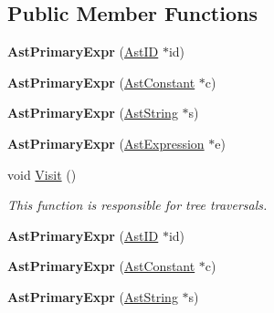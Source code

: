 \subsection*{Public Member Functions}
\begin{DoxyCompactItemize}
\item 
\hypertarget{classAstPrimaryExpr_a92ac6a98d42e522c7476768c959e2044}{{\bfseries Ast\-Primary\-Expr} (\hyperlink{classAstID}{Ast\-I\-D} $\ast$id)}\label{classAstPrimaryExpr_a92ac6a98d42e522c7476768c959e2044}

\item 
\hypertarget{classAstPrimaryExpr_a03809c945a11ab5345f50956cff84f82}{{\bfseries Ast\-Primary\-Expr} (\hyperlink{classAstConstant}{Ast\-Constant} $\ast$c)}\label{classAstPrimaryExpr_a03809c945a11ab5345f50956cff84f82}

\item 
\hypertarget{classAstPrimaryExpr_a784c92261d262fe4952963af0dd891e7}{{\bfseries Ast\-Primary\-Expr} (\hyperlink{classAstString}{Ast\-String} $\ast$s)}\label{classAstPrimaryExpr_a784c92261d262fe4952963af0dd891e7}

\item 
\hypertarget{classAstPrimaryExpr_a75b1363ac6a376ea3de63e03700072d8}{{\bfseries Ast\-Primary\-Expr} (\hyperlink{classAstExpression}{Ast\-Expression} $\ast$e)}\label{classAstPrimaryExpr_a75b1363ac6a376ea3de63e03700072d8}

\item 
void \hyperlink{classAstPrimaryExpr_adfc316933183cada2963b7b855ddb824}{Visit} ()
\begin{DoxyCompactList}\small\item\em This function is responsible for tree traversals. \end{DoxyCompactList}\item 
\hypertarget{classAstPrimaryExpr_a92ac6a98d42e522c7476768c959e2044}{{\bfseries Ast\-Primary\-Expr} (\hyperlink{classAstID}{Ast\-I\-D} $\ast$id)}\label{classAstPrimaryExpr_a92ac6a98d42e522c7476768c959e2044}

\item 
\hypertarget{classAstPrimaryExpr_a03809c945a11ab5345f50956cff84f82}{{\bfseries Ast\-Primary\-Expr} (\hyperlink{classAstConstant}{Ast\-Constant} $\ast$c)}\label{classAstPrimaryExpr_a03809c945a11ab5345f50956cff84f82}

\item 
\hypertarget{classAstPrimaryExpr_a784c92261d262fe4952963af0dd891e7}{{\bfseries Ast\-Primary\-Expr} (\hyperlink{classAstString}{Ast\-String} $\ast$s)}\label{classAstPrimaryExpr_a784c92261d262fe4952963af0dd891e7}


\end{DoxyCompactItemize}
